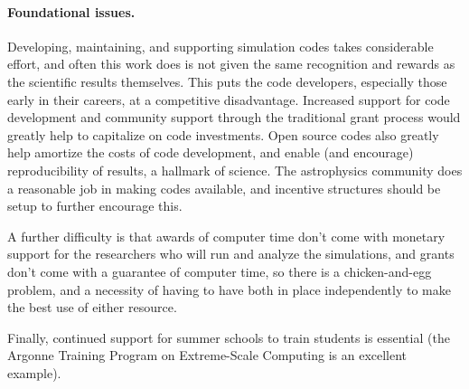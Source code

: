 \documentclass[11pt,twocolumn]{article}
\begin{document}
\paragraph*{Foundational issues.}

Developing, maintaining, and supporting simulation codes takes
considerable effort, and often this work does is not given the same
recognition and rewards as the scientific results themselves.  This
puts the code developers, especially those early in their careers, at
a competitive disadvantage. Increased support for code development and
community support through the traditional grant process would greatly
help to capitalize on code investments.  Open source codes also greatly
help amortize the costs of code development, and enable (and
encourage) reproducibility of results, a hallmark of science.  The
astrophysics community does a reasonable job in making codes available, and
incentive structures should be setup to further encourage this.

A further difficulty is that awards of computer time don't come with
monetary support for the researchers who will run and analyze the
simulations, and grants don't come with a guarantee of computer time,
so there is a chicken-and-egg problem, and a necessity of having to
have both in place independently to make the best use of either
resource.

Finally, continued support for summer schools to train students is
essential (the Argonne Training Program on Extreme-Scale Computing is
an excellent example).
\end{document}
